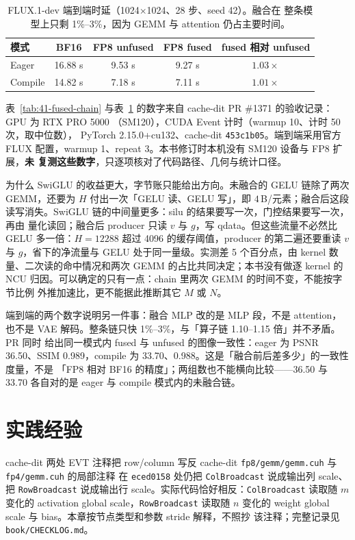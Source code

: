 \begin{table}[H]
\centering\small
\begin{tabular}{lcccc}
\toprule
模式 & BF16 & FP8 unfused & FP8 fused & fused 相对 unfused \\
\midrule
Eager   & 16.88 s & 9.53 s & 9.27 s & $1.03\times$ \\
Compile & 14.82 s & 7.18 s & 7.11 s & $1.01\times$ \\
\bottomrule
\end{tabular}
\caption{FLUX.1-dev 端到端时延（1024$\times$1024、28 步、seed 42）。融合在
整条模型上只剩 1\%--3\%，因为 GEMM 与 attention 仍占主要时间。}
\label{tab:41-fused-e2e}
\end{table}

表~\ref{tab:41-fused-chain} 与表~\ref{tab:41-fused-e2e} 的数字来自 cache-dit
PR \#1371 的验收记录：GPU 为 RTX PRO 5000
（SM120），CUDA Event 计时（warmup 10、计时 50 次，取中位数），
PyTorch 2.15.0+cu132、cache-dit \texttt{453c1b05}。端到端采用官方 FLUX
配置，warmup 1、repeat 3。本书修订时本机没有 SM120 设备与 FP8 扩展，\textbf{未
复测这些数字}，只逐项核对了代码路径、几何与统计口径。

为什么 SwiGLU 的收益更大，字节账只能给出方向。未融合的 GELU 链除了两次
GEMM，还要为 $H$ 付出一次「GELU 读、GELU 写」，即 $4$\,B/元素；融合后这段
读写消失。SwiGLU 链的中间量更多：silu 的结果要写一次，门控结果要写一次，再由
量化读回；融合后 producer 只读 $v$ 与 $g$，写 qdata。但这些流量不必然比
GELU 多一倍：$H=12288$ 超过 4096 的缓存阈值，producer 的第二遍还要重读
$v$ 与 $g$，省下的净流量与 GELU 处于同一量级。实测差 5 个百分点，由 kernel
数量、二次读的命中情况和两次 GEMM 的占比共同决定；本书没有做逐 kernel 的
NCU 归因。可以确定的只有一点：chain 里两次 GEMM 的时间不变，不能按字节比例
外推加速比，更不能据此推断其它 $M$ 或 $N$。

端到端的两个数字说明另一件事：融合 MLP 改的是 MLP 段，不是 attention，也不是
VAE 解码。整条链只快 1\%--3\%，与「算子链 1.10--1.15 倍」并不矛盾。PR 同时
给出同一模式内 fused 与 unfused 的图像一致性：eager 为 PSNR 36.50、SSIM
0.989，compile 为 33.70、0.988。这是「融合前后差多少」的一致性度量，不是
「FP8 相对 BF16 的精度」；两组数也不能横向比较——36.50 与 33.70 各自对的是
eager 与 compile 模式内的未融合链。

\section{实践经验}

\begin{kaogu}[F3]{cache-dit 两处 EVT 注释把 row/column 写反}
cache-dit \texttt{fp8/gemm/gemm.cuh} 与 \texttt{fp4/gemm.cuh} 的局部注释
在 \texttt{eced0158} 处仍把 \texttt{ColBroadcast} 说成输出列 scale、把 \texttt{RowBroadcast}
说成输出行 scale。实际代码恰好相反：\texttt{ColBroadcast} 读取随 $m$
变化的 activation global scale，\texttt{RowBroadcast} 读取随 $n$ 变化的
weight global scale 与 bias。本章按节点类型和参数 stride 解释，不照抄
该注释；完整记录见 \texttt{book/CHECKLOG.md}。
\end{kaogu}

